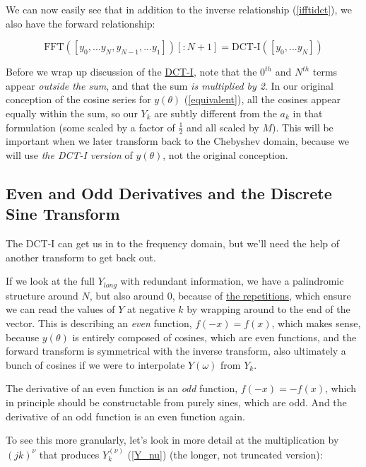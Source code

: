 \documentclass[10pt]{article}
\begin{document}
We can now easily see that in addition to the inverse relationship (\autoref{ifftidct}), we also have the forward relationship:

$$\text{FFT}([y_0, ... y_N, y_{N-1}, ... y_1])[:N+1] = \text{DCT-I}([y_0, ... y_N])$$

Before we wrap up discussion of the \href{https://docs.scipy.org/doc/scipy/reference/generated/scipy.fft.dct.html}{DCT-I}\cite{dct}, note that the $0^{th}$ and $N^{th}$ terms appear \textit{outside the sum}, and that the sum \textit{is multiplied by 2}. In our original conception of the cosine series for $y(\theta)$ (\autoref{equivalent}), all the cosines appear equally within the sum, so our $Y_k$ are subtly different from the $a_k$ in that formulation (some scaled by a factor of $\frac{1}{2}$ and all scaled by $M$). This will be important when we later transform back to the Chebyshev domain, because we will use \textit{the DCT-I version} of $y(\theta)$, not the original conception.

\subsection{Even and Odd Derivatives and the Discrete Sine Transform}

The DCT-I can get us in to the frequency domain, but we'll need the help of another transform to get back out.

If we look at the full $Y_{long}$ with redundant information, we have a palindromic structure around $N$, but also around $0$, because of \href{https://dsp.stackexchange.com/a/18931/40873}{the repetitions}\cite{bristow}, which ensure we can read the values of $Y$ at negative $k$ by wrapping around to the end of the vector. This is describing an \textit{even} function, $f(-x) = f(x)$, which makes sense, because $y(\theta)$ is entirely composed of cosines, which are even functions, and the forward transform is symmetrical with the inverse transform, also ultimately a bunch of cosines if we were to interpolate $Y(\omega)$ from $Y_k$.

The derivative of an even function is an \textit{odd} function, $f(-x) = -f(x)$, which in principle should be constructable from purely sines, which are odd. And the derivative of an odd function is an even function again.

To see this more granularly, let's look in more detail at the multiplication by $(jk)^\nu$ that produces $Y_k^{(\nu)}$ (\autoref{Y_nu}) (the longer, not truncated version):
\end{document}
